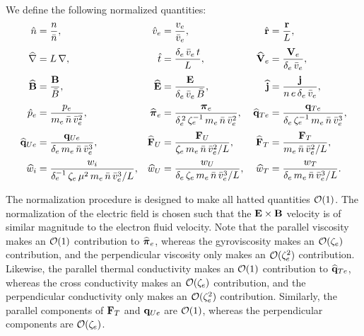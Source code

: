 \documentclass[notitlepage,12pt]{article}
\newcommand{\bpi}{\mbox{\boldmath$\pi$}}
\begin{document}
 We
define the following normalized quantities: {\small
\begin{align}
\hat{n} &= \frac{n}{\bar{n}},&
\hat{v}_e &= \frac{v_e}{\bar{v}_e}, &
\hat{\bf r} &= \frac{{\bf r}}{ L},\nonumber\\[0.5ex]
\widehat{\nabla} &= L\,\nabla, &
\hat{t} &= \frac{\delta_e\,\bar{v}_e\,t}{L}, &
\widehat{\bf V}_e &= \frac{{\bf V}_e}{\delta_e\,\bar{v}_e}, \nonumber\\[0.5ex]
\widehat{\bf B}&= \frac{{\bf B}}{\bar{B}}, &
\widehat{\bf E}& = \frac{{\bf E}}{ \delta_e\,\bar{v}_e\,\bar{B}},&
\widehat{\bf j}& =\frac{{\bf j} }{n\,e\,\delta_e\,\bar{v}_e}, \nonumber\\[0.5ex]
\hat{p}_e &= \frac{p_e}{m_e\,\bar{n}\,\bar{v}_e^{2}}, &
\widehat{\bpi}_e&= \frac{\bpi_e}{\delta_e^{\,2}\,\zeta_e^{-1}\,m_e\,\bar{n}\,\bar{v}_e^{2}}, &
\widehat{\bf q}_{Te}& = \frac{{\bf q}_{Te} }{ \delta_e\,\zeta_e^{-1}\,m_e\,\bar{n}\,\bar{v}_e^{3}}, \nonumber\\[0.5ex]
\widehat{\bf q}_{Ue} &= \frac{{\bf q}_{Ue} }{\delta_e\,m_e\,\bar{n}\,\bar{v}_e^{3}}, &
\widehat{\bf F}_U &= \frac{{\bf F}_U}{\zeta_e\,m_e\,\bar{n}\,\bar{v}_e^{2}/L}, &
\widehat{\bf F}_T &= \frac{{\bf F}_T}{m_e\,\bar{n}\,\bar{v}_e^{2}/L},\nonumber\\[0.5ex]
\widehat{w}_i &= \frac{w_i}{\delta_e^{-1}\,\zeta_e\,\mu^2\, m_e\,\bar{n}\,\bar{v}_e^{3}/L},&
\widehat{w}_U &= \frac{w_U}{\delta_e\,\zeta_e\, m_e\,\bar{n}\,\bar{v}_e^{3}/L},&
\widehat{w}_T &= \frac{w_T}{\delta_e\, m_e\,\bar{n}\,\bar{v}_e^{3}/L}.\nonumber
\end{align}}

The normalization procedure is designed to make all hatted quantities ${\cal O}(1)$.
The normalization of the electric field is chosen 
 such that the ${\bf E}\times{\bf B}$
velocity is of  similar magnitude to the electron fluid velocity. Note that the parallel viscosity
makes an ${\cal O}(1)$ contribution to $\widehat{\bpi}_e$, whereas the gyroviscosity
makes an ${\cal O}(\zeta_e)$ contribution, and the perpendicular viscosity only 
makes an ${\cal O}(\zeta_e^{2})$ contribution. Likewise, the parallel thermal
conductivity 
makes an ${\cal O}(1)$ contribution to $\widehat{\bf q}_{Te}$, whereas the cross
conductivity 
makes an ${\cal O}(\zeta_e)$ contribution, and the perpendicular conductivity only 
makes an ${\cal O}(\zeta_e^{2})$ contribution. Similarly, the parallel components
of ${\bf F}_T$ and ${\bf q}_{Ue}$ are ${\cal O}(1)$, whereas the perpendicular
components are ${\cal O}(\zeta_e)$. 
\end{document}
